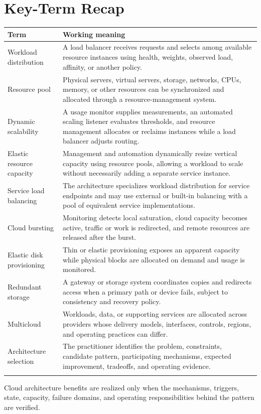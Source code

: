 \documentclass[11pt]{article}
\begin{document}
\section{Key-Term Recap}
\begin{longtable}{@{}>{\RaggedRight\arraybackslash}p{}>{\RaggedRight\arraybackslash}p{}@{}}
\toprule\rowcolor{Navy}\color{white}\textbf{Term} & \color{white}\textbf{Working meaning}\\\midrule\endhead
Workload distribution & A load balancer receives requests and selects among available resource instances using health, weights, observed load, affinity, or another policy. \\\addlinespace[2pt]
Resource pool & Physical servers, virtual servers, storage, networks, CPUs, memory, or other resources can be synchronized and allocated through a resource-management system. \\\addlinespace[2pt]
Dynamic scalability & A usage monitor supplies measurements, an automated scaling listener evaluates thresholds, and resource management allocates or reclaims instances while a load balancer adjusts routing. \\\addlinespace[2pt]
Elastic resource capacity & Management and automation dynamically resize vertical capacity using resource pools, allowing a workload to scale without necessarily adding a separate service instance. \\\addlinespace[2pt]
Service load balancing & The architecture specializes workload distribution for service endpoints and may use external or built-in balancing with a pool of equivalent service implementations. \\\addlinespace[2pt]
Cloud bursting & Monitoring detects local saturation, cloud capacity becomes active, traffic or work is redirected, and remote resources are released after the burst. \\\addlinespace[2pt]
Elastic disk provisioning & Thin or elastic provisioning exposes an apparent capacity while physical blocks are allocated on demand and usage is monitored. \\\addlinespace[2pt]
Redundant storage & A gateway or storage system coordinates copies and redirects access when a primary path or device fails, subject to consistency and recovery policy. \\\addlinespace[2pt]
Multicloud & Workloads, data, or supporting services are allocated across providers whose delivery models, interfaces, controls, regions, and operating practices can differ. \\\addlinespace[2pt]
Architecture selection & The practitioner identifies the problem, constraints, candidate pattern, participating mechanisms, expected improvement, tradeoffs, and operating evidence. \\\addlinespace[2pt]
\bottomrule
\end{longtable}
\begin{takeawaybox}
Cloud architecture benefits are realized only when the mechanisms, triggers, state, capacity, failure domains, and operating responsibilities behind the pattern are verified.
\end{takeawaybox}
\end{document}
